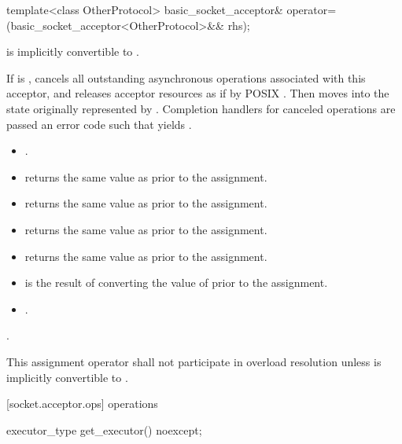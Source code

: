 \begin{itemdecl}
template<class OtherProtocol>
  basic_socket_acceptor& operator=(basic_socket_acceptor<OtherProtocol>&& rhs);
\end{itemdecl}

\begin{itemdescr}
\pnum
\requires {} is implicitly convertible to .

\pnum
\effects If  is , cancels all outstanding asynchronous operations associated with this acceptor, and releases acceptor resources as if by POSIX . Then moves into  the state originally represented by . Completion handlers for canceled operations are passed an error code  such that  yields .

\pnum
\postconditions 
\begin{itemize}
\item
{}.
\item
{} returns the same value as  prior to the assignment.
\item
{} returns the same value as  prior to the assignment.
\item
{} returns the same value as  prior to the assignment.
\item
{} returns the same value as  prior to the assignment.
\item
{} is the result of converting the value of  prior to the assignment.
\item
{}.
\end{itemize}

\pnum
\returns {}.

\pnum
\remarks This assignment operator shall not participate in overload resolution unless  is implicitly convertible to .
\end{itemdescr}



[socket.acceptor.ops]{ operations}

\begin{itemdecl}
executor_type get_executor() noexcept;
\end{itemdecl}

